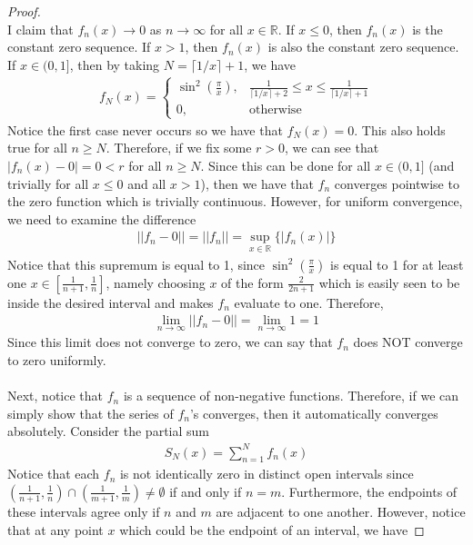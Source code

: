 \documentclass[10pt,a4paper]{article}
\theoremstyle{definition}
\theoremstyle{definition}
\numberwithin{equation}{section}
\begin{document}
\begin{proof}$ $
\\I claim that $f_n(x) \to 0$ as $n \to \infty$ for all $x \in \mathbb{R}$. If $x \leq 0$, then $f_n(x)$ is the constant zero sequence. If $x > 1$, then $f_n(x)$ is also the constant zero sequence. If $x \in (0, 1]$, then by taking $N = \lceil 1/x \rceil + 1$, we have
\begin{align*}
f_N(x) = \begin{cases}
\sin^2\left(\frac{\pi}{x}\right), & \frac{1}{\lceil 1/x \rceil + 2} \leq x \leq \frac{1}{\lceil 1/x \rceil + 1}\\
0,  &\text{otherwise}
\end{cases}
\end{align*}
Notice the first case never occurs so we have that $f_N(x) = 0$. This also holds true for all $n \geq N$. Therefore, if we fix some $r > 0$, we can see that $|f_n(x) - 0| = 0 < r$ for all $n \geq N$. Since this can be done for all $x \in (0, 1]$ (and trivially for all $x \leq 0$ and all $x > 1$), then we have that $f_n$ converges pointwise to the zero function which is trivially continuous. However, for uniform convergence, we need to examine the difference
\begin{align*}
||f_n - 0|| = ||f_n|| = \sup_{x \in \mathbb{R}} \{|f_n(x)|\}
\end{align*}
Notice that this supremum is equal to 1, since $\sin^2\left(\frac{\pi}{x}\right)$ is equal to 1 for at least one $x \in \left[\frac{1}{n + 1}, \frac{1}{n}\right]$, namely choosing $x$ of the form $\frac{2}{2n + 1}$ which is easily seen to be inside the desired interval and makes $f_n$ evaluate to one. Therefore, 
\begin{align*}
\lim_{n \to \infty} ||f_n - 0|| = \lim_{n \to \infty} 1 = 1
\end{align*}
Since this limit does not converge to zero, we can say that $f_n$ does NOT converge to zero uniformly. 
\\
\\Next, notice that $f_n$ is a sequence of non-negative functions. Therefore, if we can simply show that the series of $f_n$'s converges, then it automatically converges absolutely. Consider the partial sum
\begin{align*}
S_N(x) = \sum_{n = 1}^N f_n(x)
\end{align*}
Notice that each $f_n$ is not identically zero in distinct open intervals since $\left(\frac{1}{n + 1}, \frac{1}{n}\right) \cap \left(\frac{1}{m + 1}, \frac{1}{m}\right) \neq \emptyset$ if and only if $n = m$. Furthermore, the endpoints of these intervals agree only if $n$ and $m$ are adjacent to one another. However, notice that at any point $x$ which could be the endpoint of an interval, we have

\end{proof}
\end{document}
